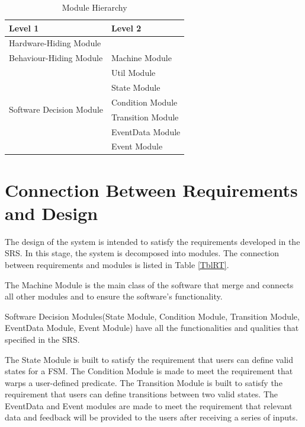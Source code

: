 \documentclass[12pt, titlepage]{article}
\begin{document}
\begin{table}[H]
\centering
\begin{tabular}{p{} p{}}
\toprule
\textbf{Level 1} & \textbf{Level 2}\\
\midrule

{Hardware-Hiding Module} & ~ \\
\midrule

\multirow{1}{0.3\textwidth}{Behaviour-Hiding Module} & Machine Module\\
\midrule

\multirow{6}{0.3\textwidth}{Software Decision Module} & {Util Module}\\
& State Module\\
& Condition Module\\
& Transition Module\\
& EventData Module\\
& Event Module\\

\bottomrule

\end{tabular}
\caption{Module Hierarchy}
\label{TblMH}
\end{table}

\section{Connection Between Requirements and Design} \label{SecConnection}

The design of the system is intended to satisfy the requirements developed in
the SRS. In this stage, the system is decomposed into modules. The connection
between requirements and modules is listed in Table \ref{TblRT}.

The Machine Module is the main class of the software that merge and connects all other modules and to ensure 
the software's functionality. 

Software Decision Modules(State Module, Condition Module, Transition Module, EventData Module, Event Module) have 
all the functionalities and qualities that specified in the SRS. 

The State Module is built to satisfy the requirement that users can define valid states for a FSM. The Condition Module is 
made to meet the requirement that warps a user-defined predicate. The Transition Module is built to satisfy the requirement 
that users can define transitions between two valid states. The EventData and Event modules are made to meet the requirement that 
relevant data and feedback will be provided to the users after receiving a series of inputs.
\end{document}
